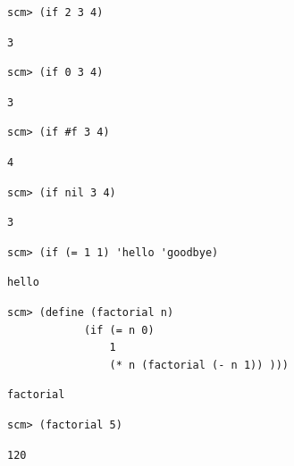 \documentclass{exam}
\begin{document}
\begin{questions}
\begin{blocksection}
\begin{lstlisting}
scm> (if 2 3 4)
\end{lstlisting}
\begin{solution}[.25in]
\begin{lstlisting}
3
\end{lstlisting}
\end{solution}

\begin{lstlisting}
scm> (if 0 3 4)
\end{lstlisting}
\begin{solution}[.25in]
\begin{lstlisting}
3
\end{lstlisting}
\end{solution}

\begin{lstlisting}
scm> (if #f 3 4)
\end{lstlisting}
\begin{solution}[.25in]
\begin{lstlisting}
4
\end{lstlisting}
\end{solution}

\begin{lstlisting}
scm> (if nil 3 4)
\end{lstlisting}
\begin{solution}[.25in]
\begin{lstlisting}
3
\end{lstlisting}
\end{solution}

\begin{lstlisting}
scm> (if (= 1 1) 'hello 'goodbye)
\end{lstlisting}
\begin{solution}[.25in]
\begin{lstlisting}
hello
\end{lstlisting}
\end{solution}

\begin{lstlisting}
scm> (define (factorial n)
            (if (= n 0)
                1
                (* n (factorial (- n 1)) )))
\end{lstlisting}
\begin{solution}[.25in]
\begin{lstlisting}
factorial
\end{lstlisting}
\end{solution}

\begin{lstlisting}
scm> (factorial 5)
\end{lstlisting}
\begin{solution}[.25in]
\begin{lstlisting}
120
\end{lstlisting}
\end{solution}


\end{blocksection}
\end{questions}
\end{document}
